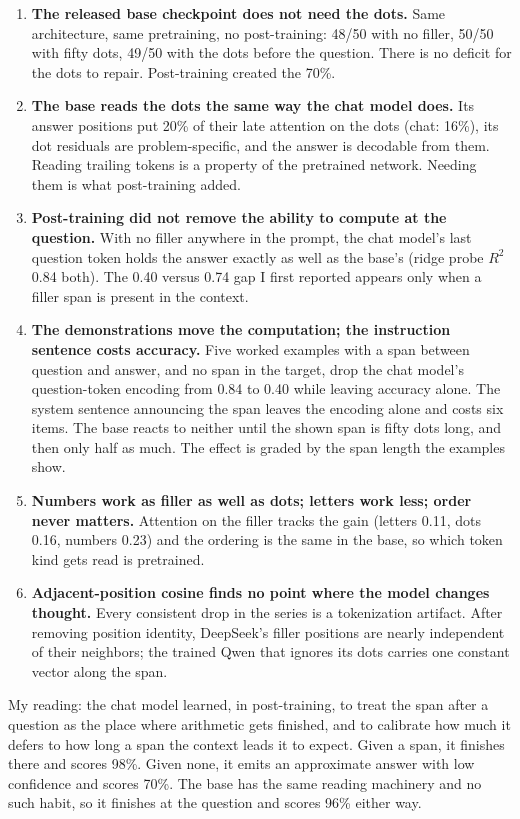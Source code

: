 \documentclass[11pt]{article}
\begin{document}
\begin{enumerate}
\item \textbf{The released base checkpoint does not need the dots.} Same architecture, same pretraining, no post-training: 48/50 with no filler, 50/50 with fifty dots, 49/50 with the dots before the question. There is no deficit for the dots to repair. Post-training created the 70\%.
\item \textbf{The base reads the dots the same way the chat model does.} Its answer positions put 20\% of their late attention on the dots (chat: 16\%), its dot residuals are problem-specific, and the answer is decodable from them. Reading trailing tokens is a property of the pretrained network. Needing them is what post-training added.
\item \textbf{Post-training did not remove the ability to compute at the question.} With no filler anywhere in the prompt, the chat model's last question token holds the answer exactly as well as the base's (ridge probe $R^2$ 0.84 both). The 0.40 versus 0.74 gap I first reported appears only when a filler span is present in the context.
\item \textbf{The demonstrations move the computation; the instruction sentence costs accuracy.} Five worked examples with a span between question and answer, and no span in the target, drop the chat model's question-token encoding from 0.84 to 0.40 while leaving accuracy alone. The system sentence announcing the span leaves the encoding alone and costs six items. The base reacts to neither until the shown span is fifty dots long, and then only half as much. The effect is graded by the span length the examples show.
\item \textbf{Numbers work as filler as well as dots; letters work less; order never matters.} Attention on the filler tracks the gain (letters 0.11, dots 0.16, numbers 0.23) and the ordering is the same in the base, so which token kind gets read is pretrained.
\item \textbf{Adjacent-position cosine finds no point where the model changes thought.} Every consistent drop in the series is a tokenization artifact. After removing position identity, DeepSeek's filler positions are nearly independent of their neighbors; the trained Qwen that ignores its dots carries one constant vector along the span.
\end{enumerate}

My reading: the chat model learned, in post-training, to treat the span after a question as the place where arithmetic gets finished, and to calibrate how much it defers to how long a span the context leads it to expect. Given a span, it finishes there and scores 98\%. Given none, it emits an approximate answer with low confidence and scores 70\%. The base has the same reading machinery and no such habit, so it finishes at the question and scores 96\% either way.
\end{document}
